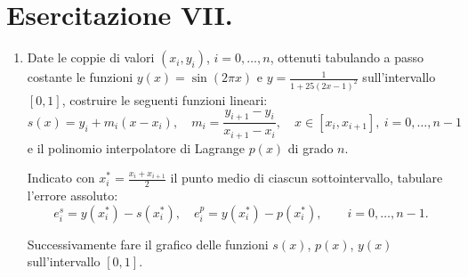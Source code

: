 \section{Esercitazione VII.}

\begin{enumerate}

\item 
Date le coppie di valori $(x_i,y_i)$, $i=0,\ldots,n$, ottenuti tabulando a 
passo costante le funzioni $y(x) = \sin(2 \pi x)$ e $y = \frac{1}{1 + 
25(2x -1)^2}$ sull'intervallo $[0,1]$, costruire le seguenti funzioni lineari:
\[
s(x) = y_i + m_i(x-x_i), \quad m_i = \frac{y_{i+1}-y_i}{x_{i+1}-x_i}, \quad
x \in [x_i,x_{i+1}], \ i = 0, \ldots, n-1
\]
e il polinomio interpolatore di Lagrange $p(x)$ di grado $n$.

Indicato con $x_i^* = \frac{x_i + x_{i+1}}{2}$ il punto medio di ciascun 
sottointervallo, tabulare l'errore assoluto:
\[
e_i^s = y(x_i^*) - s(x_i^*), \quad e_i^p = y(x_i^*) - p(x_i^*), \qquad
i = 0, \ldots, n-1.
\] 

Successivamente fare il grafico delle funzioni $s(x)$, $p(x)$, $y(x)$ 
sull'intervallo $[0,1]$.

\begin{svol}

\end{svol}


\end{enumerate}
